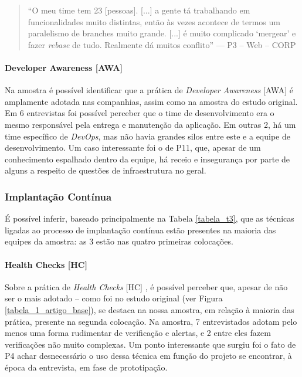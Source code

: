 \begin{quote}
    ``O meu time tem 23 [pessoas]. [...] a gente tá trabalhando em funcionalidades muito distintas, então às vezes acontece de termos um paralelismo de branches muito grande. [...] é muito complicado `mergear' e fazer \emph{rebase} de tudo. Realmente dá muitos conflito'' --- P3 -- Web -- CORP
\end{quote}


\paragraph*{Developer Awareness [AWA]}

Na amostra é possível identificar que a prática de \emph{Developer Awareness} [AWA] é amplamente adotada nas companhias, assim como na amostra do estudo original. Em 6 entrevistas foi possível perceber que o time de desenvolvimento era o mesmo responsável pela entrega e manutenção da aplicação. Em outras 2, há um time específico de \emph{DevOps}, mas não havia grandes silos entre este e a equipe de desenvolvimento. Um caso interessante foi o de P11, que, apesar de um conhecimento espalhado dentro da equipe, há receio e insegurança por parte de alguns a respeito de questões de infraestrutura no geral.


\subsubsection{Implantação Contínua}

É possível inferir, baseado principalmente na Tabela \ref{tabela_t3}, que as técnicas ligadas ao processo de implantação contínua estão presentes na maioria das equipes da amostra: as 3 estão nas quatro primeiras colocações. 

\paragraph*{Health Checks [HC]}

Sobre a prática de \emph{Health Checks} [HC] \cite{devopsBook}, é possível perceber que, apesar de não ser o mais adotado -- como foi no estudo original (ver Figura \ref{tabela_1_artigo_base}), se destaca na nossa amostra, em relação à maioria das prática, presente na segunda colocação. Na amostra, 7 entrevistados adotam pelo menos uma forma rudimentar de verificação e alertas, e 2 entre eles fazem verificações não muito complexas. Um ponto interessante que surgiu foi o fato de P4 achar desnecessário o uso dessa técnica em função do projeto se encontrar, à época da entrevista, em fase de prototipação.

